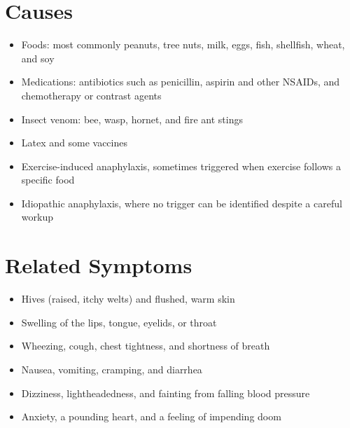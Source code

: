 \section*{Causes}
\begin{itemize}
  \item Foods: most commonly peanuts, tree nuts, milk, eggs, fish, shellfish, wheat, and soy
  \item Medications: antibiotics such as penicillin, aspirin and other NSAIDs, and chemotherapy or contrast agents
  \item Insect venom: bee, wasp, hornet, and fire ant stings
  \item Latex and some vaccines
  \item Exercise-induced anaphylaxis, sometimes triggered when exercise follows a specific food
  \item Idiopathic anaphylaxis, where no trigger can be identified despite a careful workup
\end{itemize}

\section*{Related Symptoms}
\begin{itemize}
  \item Hives (raised, itchy welts) and flushed, warm skin
  \item Swelling of the lips, tongue, eyelids, or throat
  \item Wheezing, cough, chest tightness, and shortness of breath
  \item Nausea, vomiting, cramping, and diarrhea
  \item Dizziness, lightheadedness, and fainting from falling blood pressure
  \item Anxiety, a pounding heart, and a feeling of impending doom
\end{itemize}

